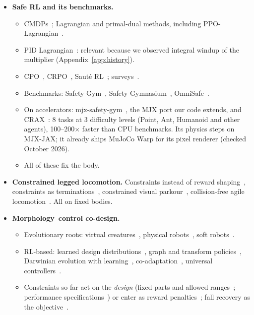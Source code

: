 \documentclass[sigconf,review]{acmart}
\begin{document}
\begin{itemize}
\item \textbf{Safe RL and its benchmarks.}
  \begin{itemize}
  \item CMDPs~\cite{altman1999constrained}; Lagrangian and primal-dual methods, including PPO-Lagrangian~\cite{ray2019benchmarking}.
  \item PID Lagrangian~\cite{stooke2020responsive}: relevant because we observed integral windup of the multiplier (Appendix~\ref{app:history}).
  \item CPO~\cite{achiam2017cpo}, CRPO~\cite{xu2021crpo}, Saut\'e RL~\cite{sootla2022saute}; surveys~\cite{garcia2015comprehensive,brunke2022safe}.
  \item Benchmarks: Safety Gym~\cite{ray2019benchmarking}, Safety-Gymnasium~\cite{ji2023safetygymnasium}, OmniSafe~\cite{ji2024omnisafe}.
  \item On accelerators: mjx-safety-gym~\cite{vanderhart_mjxsafetygym}, the MJX port our code extends, and CRAX~\cite{tomilin2026crax}: 8 tasks at 3 difficulty levels (Point, Ant, Humanoid and other agents), 100--200$\times$ faster than CPU benchmarks. Its physics steps on MJX-JAX; it already ships MuJoCo Warp for its pixel renderer (checked October 2026).
  \item All of these fix the body.
  \end{itemize}
\item \textbf{Constrained legged locomotion.} Constraints instead of reward shaping~\cite{kim2024constraints}, constraints as terminations~\cite{chanesane2024cat}, constrained visual parkour~\cite{chanesane2024soloparkour}, collision-free agile locomotion~\cite{he2024agile}. All on fixed bodies.
\item \textbf{Morphology--control co-design.}
  \begin{itemize}
  \item Evolutionary roots: virtual creatures~\cite{sims1994evolving}, physical robots~\cite{lipson2000automatic}, soft robots~\cite{cheney2013unshackling,bhatia2021evolution}.
  \item RL-based: learned design distributions~\cite{ha2019reinforcement,schaff2019jointly,schaff2022nlimb}, graph and transform policies~\cite{wang2019nge,yuan2022transform2act}, Darwinian evolution with learning~\cite{gupta2021embodied}, co-adaptation~\cite{luck2019data}, universal controllers~\cite{huang2020one,kurin2021my,gupta2022metamorph}.
  \item Constraints so far act on the \emph{design} (fixed parts and allowed ranges~\cite{constrainedevolution2022}; performance specifications~\cite{glamdring2026}) or enter as reward penalties~\cite{codesign2025notfree}; fall recovery as the objective~\cite{yue2025humanoid}.

\end{itemize}
\end{itemize}
\end{document}
